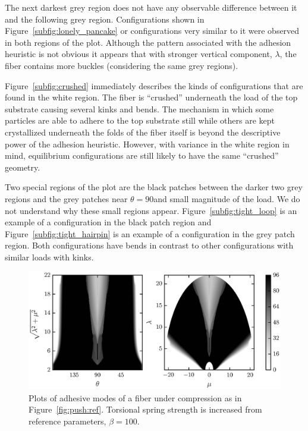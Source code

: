 The next darkest grey region does not have any observable difference between it and the following grey region. Configurations shown in Figure~\ref{subfig:lonely_pancake} or configurations very similar to it were observed in both regions of the plot. Although the pattern associated with the adhesion heuristic is not obvious it appears that with stronger vertical component, $\lambda$, the fiber contains more buckles (considering the same grey regions).

Figure~\ref{subfig:crushed} immediately describes the kinds of configurations that are found in the white region. The fiber is ``crushed'' underneath the load of the top substrate causing several kinks and bends. The mechanism in which some particles are able to adhere to the top substrate still while others are kept crystallized underneath the folds of the fiber itself is beyond the descriptive power of the adhesion heuristic. However, with variance in the white region in mind, equilibrium configurations are still likely to have the same ``crushed'' geometry.

Two special regions of the plot are the black patches between the darker two grey regions and the grey patches near $\theta=90$\textdegree and small magnitude of the load. We do not understand why these small regions appear. Figure~\ref{subfig:tight_loop} is an example of a configuration in the black patch region and Figure~\ref{subfig:tight_hairpin} is an example of a configuration in the grey patch region. Both configurations have bends in contrast to other configurations with similar loads with kinks.

	\begin{figure}[t]
		\begin{center}
			\includegraphics{./fig/ch3/push/b100/grid.eps}
		\end{center}		
		\caption{Plots of adhesive modes of a fiber under compression as in Figure~\ref{fig:push:ref}. Torsional spring strength is increased from reference parameters, $\beta=100$.
		\label{fig:push:b100}}
	\end{figure}	
	
